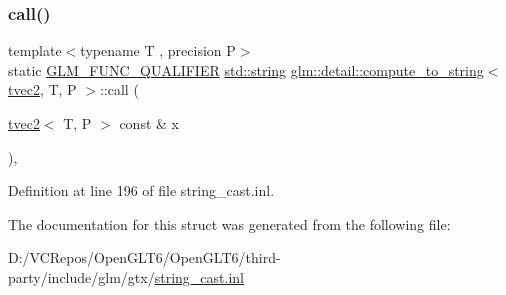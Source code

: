 \subsubsection{\texorpdfstring{call()}{call()}}
{\footnotesize\ttfamily template$<$typename T , precision P$>$ \\
static \mbox{\hyperlink{setup_8hpp_a33fdea6f91c5f834105f7415e2a64407}{G\+L\+M\+\_\+\+F\+U\+N\+C\+\_\+\+Q\+U\+A\+L\+I\+F\+I\+ER}} \mbox{\hyperlink{glad_8h_ac83513893df92266f79a515488701770}{std\+::string}} \mbox{\hyperlink{structglm_1_1detail_1_1compute__to__string}{glm\+::detail\+::compute\+\_\+to\+\_\+string}}$<$ \mbox{\hyperlink{structglm_1_1tvec2}{tvec2}}, T, P $>$\+::call (\begin{DoxyParamCaption}\item[{\mbox{\hyperlink{structglm_1_1tvec2}{tvec2}}$<$ T, P $>$ const \&}]{x }\end{DoxyParamCaption})\hspace{0.3cm}{\ttfamily [inline]}, {\ttfamily [static]}}



Definition at line 196 of file string\+\_\+cast.\+inl.



The documentation for this struct was generated from the following file\+:\begin{DoxyCompactItemize}
\item 
D\+:/\+V\+C\+Repos/\+Open\+G\+L\+T6/\+Open\+G\+L\+T6/third-\/party/include/glm/gtx/\mbox{\hyperlink{string__cast_8inl}{string\+\_\+cast.\+inl}}\end{DoxyCompactItemize}
